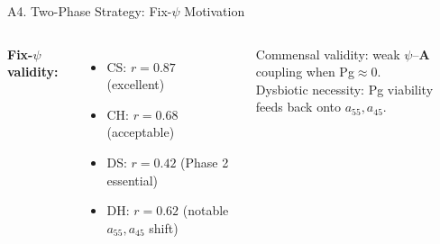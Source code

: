\documentclass[aspectratio=169,10pt,t]{beamer}
\begin{document}
\begin{frame}[t]{A4. Two-Phase Strategy: Fix-$\psi$ Motivation}
\begin{columns}[T]
      \vspace{8pt}
      \textbf{Fix-$\psi$ validity:}
      \begin{itemize}\setlength{\itemsep}{2pt}
        \item CS: $r=0.87$\; (excellent)
        \item CH: $r=0.68$\; (acceptable)
        \item DS: $r=0.42$\; (Phase 2 essential)
        \item DH: $r=0.62$\; (notable $a_{55},a_{45}$ shift)
      \end{itemize}
      Commensal validity: weak $\psi$--$\mathbf{A}$ coupling when Pg$\approx0$.\\
      Dysbiotic necessity: Pg viability feeds back onto $a_{55},a_{45}$.
  \end{columns}
\end{frame}
\end{document}
